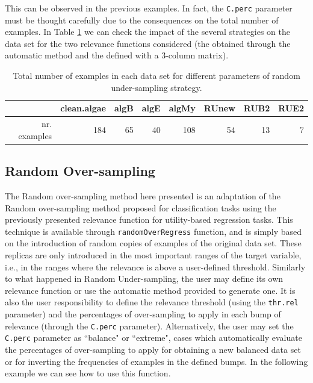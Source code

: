 \documentclass[10pt,a4paper]{article}\usepackage[]{graphicx}\usepackage[]{color}
\begin{document}
This can be observed in the previous examples. In fact, the \texttt{C.perc} parameter must be thought carefully due to the consequences on the total number of examples. In Table \ref{tab:RUReg_table} we can check the impact of the several strategies on the data set for the two relevance functions considered (the obtained through the automatic method and the defined with a 3-column matrix).

\begin{table}[ht]
\centering
\begin{tabular}{rrrrrrrr}
  \hline
 & clean.algae & algB & algE & algMy & RUnew & RUB2 & RUE2 \\ 
  \hline
nr. examples & 184 &  65 &  40 & 108 &  54 &  13 &   7 \\ 
   \hline
\end{tabular}
\caption{Total number of examples in each data set for different parameters of random under-sampling strategy.} 
\label{tab:RUReg_table}
\end{table}




\subsection{Random Over-sampling}\label{sec:RORegress}

The Random over-sampling method here presented is an adaptation of the Random over-sampling method proposed for classification tasks using the previously presented relevance function for utility-based regression tasks. This technique is available through \texttt{randomOverRegress} function, and is simply based on the introduction of random copies of examples of the original data set. These replicas are only introduced in the most important ranges of the target variable, i.e., in the ranges where the relevance is above a user-defined threshold. Similarly to what happened in Random Under-sampling, the user may define its own relevance function or use the automatic method provided to generate one. It is also the user responsibility to define the relevance threshold (using the \texttt{thr.rel} parameter) and the percentages of over-sampling to apply in each bump of relevance (through the \texttt{C.perc} parameter). Alternatively, the user may set the \texttt{C.perc} parameter as ``balance" or ``extreme", cases which automatically evaluate the percentages of over-sampling to apply for obtaining a new balanced data set or for inverting the frequencies of examples in the defined bumps.
In the following example we can see how to use this function.
\end{document}
